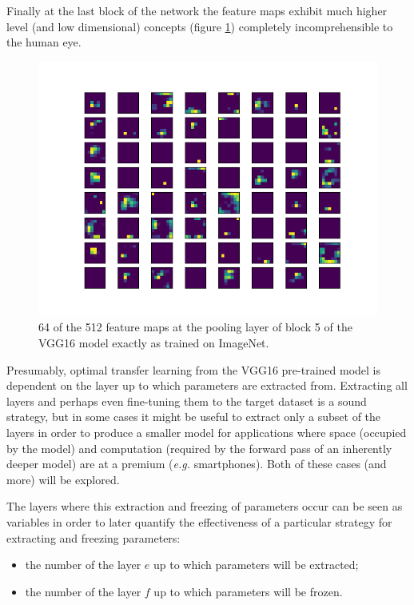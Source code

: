 Finally at the last block of the network the feature maps exhibit much higher level (and low dimensional) concepts (figure \ref{fig:vgg16_block5}) completely incomprehensible to the human eye.

\begin{figure}
    \centering
    \includegraphics[width=1.0\textwidth]{figs/vgg16_block5.png}
    \caption{64 of the 512 feature maps at the pooling layer of block 5 of the VGG16 model exactly as trained on ImageNet.}
    \label{fig:vgg16_block5}
\end{figure}

Presumably, optimal transfer learning from the VGG16 pre-trained model is dependent on the layer up to which parameters are extracted from. Extracting all layers and perhaps even fine-tuning them to the target dataset is a sound strategy, but in some cases it might be useful to extract only a subset of the layers in order to produce a smaller model for applications where space (occupied by the model) and computation (required by the forward pass of an inherently deeper model) are at a premium (\textit{e.g.} smartphones). Both of these cases (and more) will be explored.

The layers where this extraction and freezing of parameters occur can be seen as variables in order to later quantify the effectiveness of a particular strategy for extracting and freezing parameters:

\begin{itemize}
    \item the number of the layer $e$ up to which parameters will be extracted;
    \item the number of the layer $f$ up to which parameters will be frozen.
\end{itemize}

